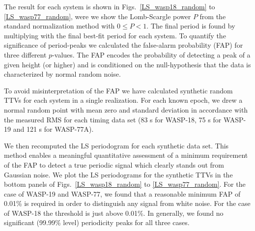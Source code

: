 The result for each system is shown in Figs.~\ref{LS_wasp18_random} to \ref{LS_wasp77_random}, were we show the Lomb-Scargle power $P$ from the standard normalization method with $0\le P<1$. The final period is found by multiplying with the final best-fit period for each system. To quantify the significance of period-peaks we calculated the false-alarm probability (FAP) for three different $p$-values. The FAP encodes the probability of detecting a peak of a given height (or higher) and is conditioned on the null-hypothesis that the data is characterized by normal random noise. 

To avoid misinterpretation of the FAP we have calculated synthetic random TTVs for each system in a single realization. For each known epoch, we drew a normal random point with mean zero and standard deviation in accordance with the measured RMS for each timing data set (83 s for WASP-18, 75 s for WASP-19 and 121 s for WASP-77A).

We then recomputed the LS periodogram for each synthetic data set. This method enables a meaningful quantitative assessment of a minimum requirement of the FAP to detect a true periodic signal which clearly stands out from Gaussian noise. We plot the LS periodograms for the synthetic TTVs in the bottom panels of Figs.~\ref{LS_wasp18_random} to \ref{LS_wasp77_random}. For the case of WASP-19 and WASP-77, we found that a reasonable minimum FAP of 0.01\% is required in order to distinguish any signal from white noise. For the case of WASP-18 the threshold is just above 0.01\%. In generally, we found no significant (99.99\% level) periodicity peaks for all three cases.


